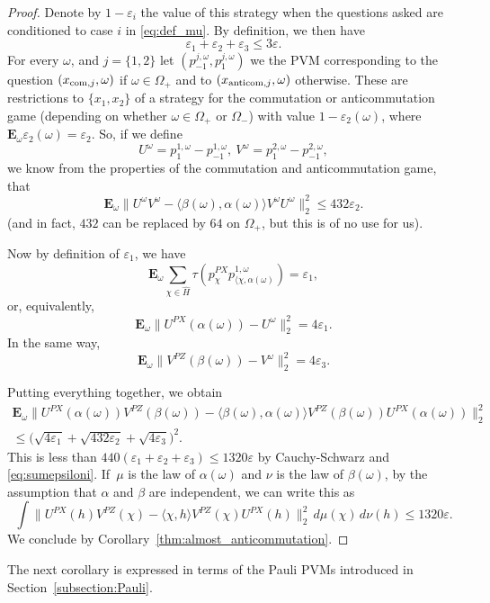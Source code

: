 \documentclass[JEP,XML,SOM,Unicode,published]{cedram}
\newcommand{\com}{\textup{com}}
\theoremstyle{plain}
\theoremstyle{definition}
\newcommand{\E}{\mathbf{E}}
\newcommand{\anticom}{\textup{anticom}}
\begin{document}
\begin{proof}
Denote by $1-\varepsilon_i$ the value of this strategy when the questions asked are conditioned to case $i$ in \eqref{eq:def_mu}. By definition, we then have
\begin{equation}\label{eq:sumepsiloni} \varepsilon_1+\varepsilon_2+\varepsilon_3\leq 3 \varepsilon.
\end{equation}
For every $\omega$, and $j=\{1,2\}$ let $(p^{j,\omega}_{-1},p^{j,\omega}_{1})$ we the PVM corresponding to the question $(x_{\com,j},\omega)$ if $\omega \in \Omega_+$ and to $(x_{\anticom,j},\omega)$ otherwise. These are restrictions to $\{x_1,x_2\}$ of a strategy for the commutation or anticommutation game (depending on whether $\omega \in \Omega_+$ or $\Omega_-$) with value $1-\varepsilon_2(\omega)$, where $\E_\omega \varepsilon_2(\omega) = \varepsilon_2$. So, if we define
\[
U^{\omega} = p^{1,\omega}_{1}-p^{1,\omega}_{-1},\ V^{\omega} = p^{2,\omega}_{1}-p^{2,\omega}_{-1},
\] we know from the properties of the commutation and anticommutation game, that
\[
\E_\omega \|U^{\omega} V^{\omega} - \langle \beta(\omega), \alpha(\omega)\rangle V^{\omega} U^{\omega}\|_2^2 \leq 432 \varepsilon_2.
\]
(and in fact, $432$ can be replaced by $64$ on $\Omega_+$, but this is of no use for us).

Now by definition of $\varepsilon_1$, we have
\[
\E_\omega \sum_{\chi \in \hat H} \tau(p^{PX}_\chi p^{1,\omega}_{\langle \chi,\alpha(\omega)}) = \varepsilon_1,
\]
or, equivalently,
\[
\E_\omega \| U^{PX}(\alpha(\omega)) - U^\omega\|_2^2 = 4\varepsilon_1.
\]
In the same way,
\[
\E_\omega \| V^{PZ}(\beta(\omega)) - V^\omega\|_2^2 = 4\varepsilon_3.
\]

Putting everything together, we obtain
\begin{multline*} \E_\omega \bigl\|U^{PX}(\alpha(\omega)) V^{PZ}(\beta(\omega)) - \langle \beta(\omega),\alpha(\omega)\rangle V^{PZ}(\beta(\omega)) U^{PX}(\alpha(\omega))\bigr\|_2^2\\ \leq \bigl(\sqrt{4\varepsilon_1} + \sqrt{432 \varepsilon_2}+\sqrt{4\varepsilon_3}\bigr)^2.
\end{multline*}
This is less than $440(\varepsilon_1+\varepsilon_2+\varepsilon_3) \leq 1320\varepsilon$ by Cauchy-Schwarz and \eqref{eq:sumepsiloni}. If~$\mu$ is the law of $\alpha(\omega)$ and $\nu$ is the law of $\beta(\omega)$, by the assumption that $\alpha$ and $\beta$ are independent, we can write this as
\[
\int \bigl\|U^{PX}(h) V^{PZ}(\chi) - \langle \chi,h\rangle V^{PZ}(\chi) U^{PX}(h)\bigr\|_2^2 \,d\mu(\chi) \,d\nu(h) \leq 1320 \varepsilon.
\]
We conclude by Corollary~\ref{thm:almost_anticommutation}.
\end{proof}
The next corollary is expressed in terms of the Pauli PVMs introduced in Section~\ref{subsection:Pauli}.
\end{document}
